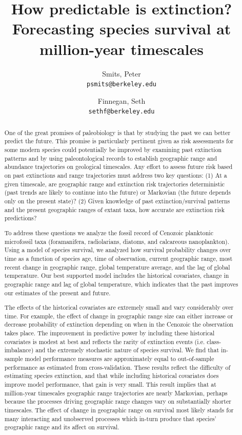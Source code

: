 \documentclass[12pt,letterpaper]{article}
\title{How predictable is extinction? Forecasting species survival at million-year timescales}
\author{
  Smits, Peter\\
  \texttt{psmits@berkeley.edu} 
  \and
  Finnegan, Seth\\
  \texttt{sethf@berkeley.edu}
}
\begin{document}
\maketitle

\begin{abstract}
  One of the great promises of paleobiology is that by studying the past we can better predict the future.  This promise is particularly pertinent given as risk assessments for some modern species could potentially be improved by examining past extinction patterns and by using paleontological records to establish geographic range and abundance trajectories on geological timescales.  Any effort to assess future risk based on past extinctions and range trajectories must address two key questions:  (1) At a given timescale, are geographic range and extinction risk trajectories deterministic (past trends are likely to continue into the future) or Markovian (the future depends only on the present state)? (2) Given knowledge of past extinction/survival patterns and the present geographic ranges of extant taxa, how accurate are extinction risk predictions?  

  To address these questions we analyze the fossil record of Cenozoic planktonic microfossil taxa (foramanifera, radiolarians, diatoms, and calcareous nanoplankton). Using a model of species survival, we analyzed how survival probability changes over time as a function of species age, time of observation, current geographic range, most recent change in geographic range, global temperature average, and the lag of global temperature. Our best supported model includes the historical covariates, change in geographic range and lag of global temperature, which indicates that the past improves our estimates of the present and future. 

  The effects of the historical covariates are extremely small and vary considerably over time. For example, the effect of change in geographic range size can either increase or decrease probability of extinction depending on when in the Cenozoic the observation takes place. The improvement in predictive power by including these historical covariates is modest at best and reflects the rarity of extinction events (i.e. class-imbalance) and the extremely stochastic nature of species survival. We find that in-sample model performance measures are approximately equal to out-of-sample performance as estimated from cross-validation. These results reflect the difficulty of estimating species extinction, and that while including historical covariates does improve model performance, that gain is very small.  This result implies that at million-year timescales geographic range trajectories are nearly Markovian, perhaps because the processes driving geographic range changes vary on substantially shorter timescales. The effect of change in geographic range on survival most likely stands for many interacting and unobserved processes which in-turn produce that species' geographic range and its affect on survival. 



\end{abstract}
\end{document}

